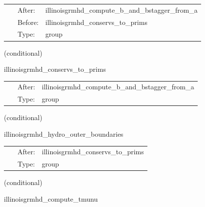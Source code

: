  \begin{tabular*}{160mm}{cll} 
~ & After:  & illinoisgrmhd\_compute\_b\_and\_bstagger\_from\_a \\ 
~ & Before:  & illinoisgrmhd\_conservs\_to\_prims \\ 
~ & Type:  & group \\ 
\end{tabular*} 


\vspace{5mm}

   (conditional) 

\hspace{5mm} illinoisgrmhd\_conservs\_to\_prims 

\hspace{5mm}{\it compute primitive variables from conservatives } 


\hspace{5mm}

 \begin{tabular*}{160mm}{cll} 
~ & After:  & illinoisgrmhd\_compute\_b\_and\_bstagger\_from\_a \\ 
~ & Type:  & group \\ 
\end{tabular*} 


\vspace{5mm}

   (conditional) 

\hspace{5mm} illinoisgrmhd\_hydro\_outer\_boundaries 

\hspace{5mm}{\it apply selected boundary conditions to the primitive variables } 


\hspace{5mm}

 \begin{tabular*}{160mm}{cll} 
~ & After:  & illinoisgrmhd\_conservs\_to\_prims \\ 
~ & Type:  & group \\ 
\end{tabular*} 


\vspace{5mm}

   (conditional) 

\hspace{5mm} illinoisgrmhd\_compute\_tmunu 

\hspace{5mm}{\it compute stress-energy tensor } 


